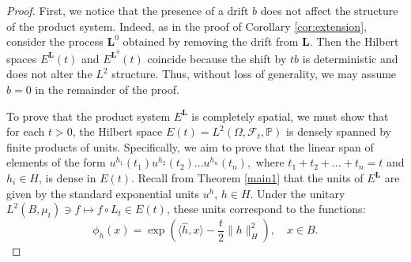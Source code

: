 \documentclass[11pt]{amsart}
\theoremstyle{definition}
\theoremstyle{remark}
\numberwithin{equation}{section}
\begin{document}
\begin{proof} First, we notice that the presence of a drift \( b \) does not affect the structure of the product system. Indeed, as in the proof of Corollary \ref{cor:extension}, consider the process \( \bm{L}^0\) obtained by removing the drift from  \( \bm{L}\). Then the Hilbert spaces \( E^{\bm{L}}(t)\)  and \( E^{\bm{L}^0}(t)\)  coincide because the shift by \( t b \) is deterministic and does not alter the \( L^2 \) structure. Thus, without loss of generality, we may assume \( b = 0 \)  in the remainder of the proof.

To prove that the product system \( E^{\bm{L}} \) is completely spatial, we must show that for each \( t > 0 \), the Hilbert space \( E(t) = L^2(\Omega, \mathcal{F}_t, \mathbb{P}) \) is densely spanned by finite products of units. Specifically, we aim to prove that the linear span of elements of the form
\(
u^{h_1}(t_1) u^{h_2}(t_2) \dots u^{h_n}(t_n),
\)
where \( t_1 + t_2 + \dots + t_n = t \) and \( h_i \in H \), is dense in \( E(t) \).
Recall from Theorem \ref{main1} that the units of \( E^{\bm{L}} \) are given by the standard exponential units \(u^h\), \(h\in H\). Under the unitary \(
L^2(B, \mu_t)\ni f  \mapsto f \circ L_t\in E(t)\), these units correspond to the functions:
\[
\phi_h(x) = \exp\left( \langle \hat{h}, x \rangle - \frac{t}{2} \| h \|_H^2 \right), \quad x \in B.
\]


\end{proof}
\end{document}
